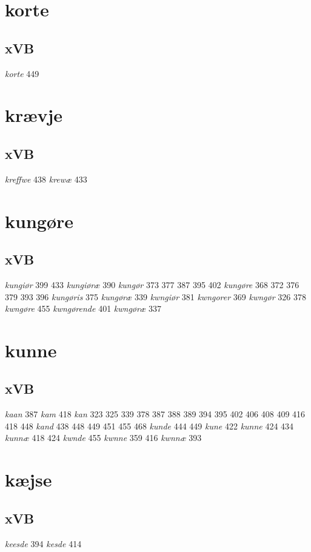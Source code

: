 \documentclass[a4paper,twocolumn]{article}
\begin{document}
\section{korte}
\label{sec:org38c9ada}
\subsection{xVB}
\label{sec:org44cf601}
\emph{korte} 449 
\section{krævje}
\label{sec:org17ae1a9}
\subsection{xVB}
\label{sec:org170b2a8}
\emph{kreffwe} 438 \emph{krewæ} 433 
\section{kungøre}
\label{sec:org6acffc2}
\subsection{xVB}
\label{sec:org9219655}
\emph{kungiør} 399 433 \emph{kungiøræ} 390 \emph{kungør} 373 377 387 395 402 \emph{kungøre} 368 372 376 379 393 396 \emph{kungøris} 375 \emph{kungøræ} 339 \emph{kwngiør} 381 \emph{kwngorer} 369 \emph{kwngør} 326 378 \emph{kwngøre} 455 \emph{kwngørende} 401 \emph{kwngøræ} 337 
\section{kunne}
\label{sec:org4cb6276}
\subsection{xVB}
\label{sec:org5a78139}
\emph{kaan} 387 \emph{kam} 418 \emph{kan} 323 325 339 378 387 388 389 394 395 402 406 408 409 416 418 448 \emph{kand} 438 448 449 451 455 468 \emph{kunde} 444 449 \emph{kune} 422 \emph{kunne} 424 434 \emph{kunnæ} 418 424 \emph{kwnde} 455 \emph{kwnne} 359 416 \emph{kwnnæ} 393 
\section{kæjse}
\label{sec:org706189f}
\subsection{xVB}
\label{sec:org4b83e38}
\emph{keesde} 394 \emph{kesde} 414 
\end{document}
